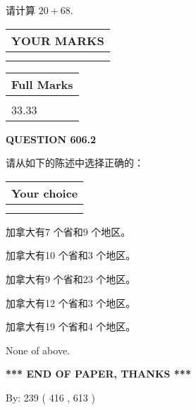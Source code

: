 \documentclass{ctexart}
\begin{document}
  
 
请计算 $ %
20 +  %
68 $.
 

 

 
  
\vspace{0.2in}
  
\noindent\begin{tabular}{|l|}
\hline
 YOUR MARKS  \\
\hline
 \\ 
 \\ 
\hline
\end{tabular}
\hspace{0.05in} \begin{tabular}{|l|}
\hline
 Full Marks  \\
\hline
 \\ 
33.33 \\
\hline
\end{tabular}
{\textbf{\Large{QUESTION
606.2 
}}}
  
  
请从如下的陈述中选择正确的：
  
  
\noindent\hspace{3.0in} \begin{tabular}{|l|}
\hline
Your choice \\
\hline
 \\ 
 \\ 
\hline
\end{tabular}
  
  
 
 
加拿大有7 个省和9 个地区。
 
 
加拿大有10 个省和3 个地区。
 
 
加拿大有9 个省和23 个地区。
 
 
加拿大有12 个省和3 个地区。
 
 
加拿大有19 个省和4 个地区。
 
 
 None of above.
 
 
   
   
 \vspace{0.2in}
 
   
   
   
   
\vspace{1.0in} 
{\textbf{\large{ *** END OF PAPER, THANKS *** }}} 
   
   
\hspace{1.0in} By: 
 239 ( 416 ,  613 )
   
\end{document}
